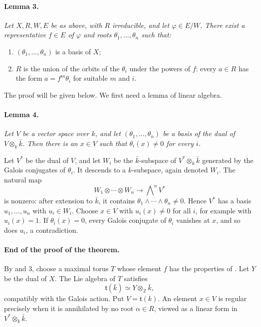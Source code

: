 \paragraph{\textbf{Lemma 3.}}
{\itshape Let \(X,R,W,E\) be as above, with \(R\) irreducible,
and let \(\varphi\in E/W\). There exist a representative
\(f\in E\) of \(\varphi\) and roots
\(\theta_1,\ldots,\theta_n\) such that:
\begin{enumerate}
\item \((\theta_1,\ldots,\theta_n)\) is a basis of \(X\);
\item \(R\) is the union of the orbits of the \(\theta_i\) under
the powers of \(f\): every \(a\in R\) has the form
\(a=f^m\theta_i\) for suitable \(m\) and \(i\).
\end{enumerate}}

The proof will be given below. We first need a lemma of linear
algebra.

\paragraph{\textbf{Lemma 4.}}
{\itshape Let \(V\) be a vector space over \(k\), and let
\((\theta_1,\ldots,\theta_n)\) be a basis of the dual of
\(V\otimes_k\bar k\). Then there is an \(x\in V\) such that
\(\theta_i(x)\ne0\) for every \(i\).}

Let \(V^*\) be the dual of \(V\), and let \(W_i\) be the
\(\bar k\)-subspace of \(V^*\otimes_k\bar k\) generated by the
Galois conjugates of \(\theta_i\). It descends to a
\(k\)-subspace, again denoted \(W_i\). The natural map
\[
  W_1\otimes\cdots\otimes W_n
     \longrightarrow\bigwedge\nolimits^n V^*
\]
is nonzero: after extension to \(\bar k\), it contains
\(\theta_1\wedge\cdots\wedge\theta_n\ne0\). Hence \(V^*\) has a
basis \(u_1,\ldots,u_n\) with \(u_i\in W_i\). Choose
\(x\in V\) with \(u_i(x)\ne0\) for all \(i\), for example with
\(u_i(x)=1\). If \(\theta_i(x)=0\), every Galois conjugate of
\(\theta_i\) vanishes at \(x\), and so does \(u_i\), a
contradiction.

\paragraph{\textbf{End of the proof of the theorem.}}

By  and 3, choose a maximal torus \(T\) whose element
\(f\) has the properties of . Let \(Y\) be the dual of
\(X\). The Lie algebra of \(T\) satisfies
\[
  \mathfrak t(\bar k)\simeq Y\otimes_{\mathbb Z}\bar k,
\]
compatibly with the Galois action. Put
\(V=\mathfrak t(k)\). An element \(x\in V\) is regular precisely
when it is annihilated by no root \(\alpha\in R\), viewed as a
linear form in \(V^*\otimes_k\bar k\).

